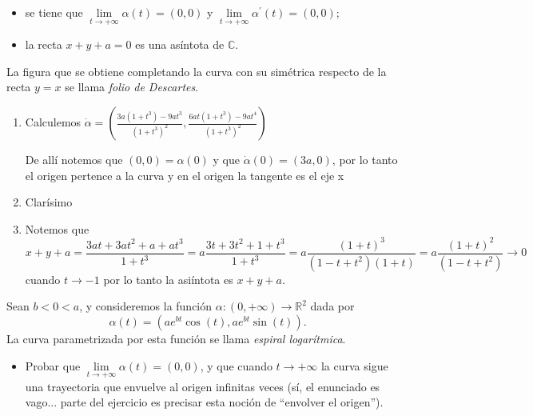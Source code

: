 \documentclass[11pt]{article}
\newcommand{\C}{\mathbb{C}}
\newcommand{\R}{{\mathbb{R}}}
\newenvironment{proof}[1][Demostraci\'on]{\begin{trivlist}
		\item[\hskip \labelsep {\bfseries #1}]}{\end{trivlist}}
\newcommand{\qed}{\nobreak \ifvmode \relax \else
	\ifdim\lastskip<1.5em \hskip-\lastskip
	\hskip1.5em plus0em minus0.5em \fi \nobreak
	\vrule height0.75em width0.5em depth0.25em\fi}
\begin{document}
\begin{enumerate}
\begin{itemize}
		\item se tiene que $\lim\limits_{t\to +\infty }\alpha (t)=(0,0)$ y
		$\lim\limits_{t\to +\infty }\alpha ^{\prime }(t)=(0,0)$;
		
		\item la recta $x+y+a=0$ es una as\'intota de $\C$.
		
	\end{itemize}
	La figura que se obtiene completando la curva con su sim\'etrica respecto de la recta $y=x$
	se llama \emph{folio de Descartes}.

	\label{Ejercicio 3}
	
	\begin{proof}
		
		\begin{enumerate}
			
			\item Calculemos $\dot{\alpha} = \left( \frac{3a(1+t^3) - 9at^3}{(1+ t^3)^2} , \frac{6at(1+t^3) - 9at^4}{(1+ t^3)^2}   \right)$
			
			De all\'i notemos que $(0,0) = \alpha(0)$ y que $\dot{\alpha}(0) = (3a,0)$, por lo tanto el origen pertence a la curva y en el origen la tangente es el eje x
			
			\item Clar\'isimo
			
			\item Notemos que $x + y + a = \dfrac{3at + 3at^2 + a + at^3}{1 + t^3} = a \dfrac{3t + 3t^2 + 1 + t^3}{1 + t^3} =  a \dfrac{(1+t)^3}{(1 -t + t^2)(1+t)} = a \dfrac{(1+t)^2}{(1 -t + t^2)} \rightarrow 0 $ cuando $t \rightarrow -1 $ por lo tanto la asi\'intota es $x +y +a$. \qed	
		\end{enumerate}
		
	\end{proof}
		
	
	\item  Sean $ b < 0 < a$, y consideremos la funci\'on $\alpha:(0,+\infty) \to \R^2$ dada
	por
	\[		
	\alpha (t)=(ae^{bt}\cos(t), ae^{bt}\sin (t)). 
	\]	
	La curva parametrizada por esta funci\'on se llama \emph{espiral logar\'itmica}. 

	
	\begin{itemize}
		\item Probar que $\lim\limits_{t\to +\infty }\alpha (t)=(0,0)$, y que cuando $t\to+\infty$ la
		curva sigue una trayectoria que envuelve al origen infinitas veces (s\'i, el enunciado es
		vago... parte del ejercicio es precisar esta noci\'on de ``envolver el origen'').
		

\end{itemize}
\end{enumerate}
\end{document}
